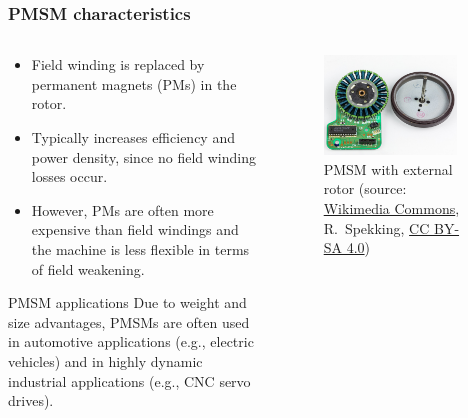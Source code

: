 \begin{frame}
	\frametitle{PMSM characteristics}	
    \begin{columns}
		\begin{column}{0.5\textwidth}
			\begin{itemize}
				\item<1-> Field winding is replaced by permanent magnets (PMs) in the rotor.
				\item<2-> Typically increases efficiency and power density, since no field winding losses occur.
				\item<3-> However, PMs are often more expensive than field windings and the machine is less flexible in terms of field weakening.
			\end{itemize}
			\vspace{-0.25cm}
			\begin{varblock}
				{PMSM applications}
					Due to weight and size advantages, PMSMs are often used in automotive applications (e.g., electric vehicles) and in highly dynamic industrial applications (e.g., CNC servo drives).
			\end{varblock}
		\end{column}
        \begin{column}{0.5\textwidth}
			\onslide<1->
            \begin{figure}
                \centering
                \includegraphics[width=0.9\textwidth]{fig/lec07/External_rotor_PMSM.jpg}
                \caption{PMSM with external rotor (source: \href{https://commons.wikimedia.org/wiki/File:General_Technic_GT_9840_-_capstan_motor-6683.jpg}{Wikimedia Commons},  R.~Spekking, \href{https://creativecommons.org/licenses/by-sa/4.0/deed}{CC BY-SA 4.0})}
                \label{fig:External_rotor_PMSM}
            \end{figure}
        \end{column}
    \end{columns}
\end{frame}

